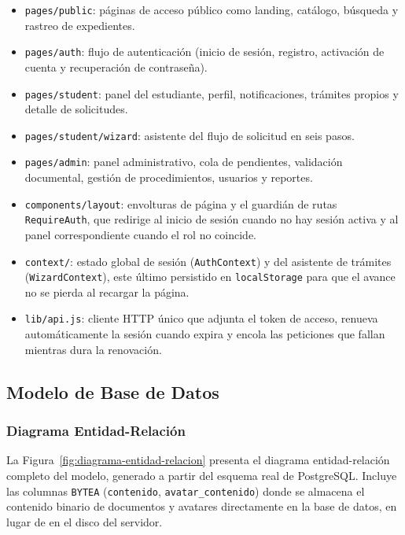 \begin{itemize}
    \item \texttt{pages/public}: páginas de acceso público como landing,
    catálogo, búsqueda y rastreo de expedientes.
    \item \texttt{pages/auth}: flujo de autenticación (inicio de sesión,
    registro, activación de cuenta y recuperación de contraseña).
    \item \texttt{pages/student}: panel del estudiante, perfil, notificaciones,
    trámites propios y detalle de solicitudes.
    \item \texttt{pages/student/wizard}: asistente del flujo de solicitud
    en seis pasos.
    \item \texttt{pages/admin}: panel administrativo, cola de pendientes,
    validación documental, gestión de procedimientos, usuarios y reportes.
    \item \texttt{components/layout}: envolturas de página y el guardián de
    rutas \texttt{RequireAuth}, que redirige al inicio de sesión cuando no
    hay sesión activa y al panel correspondiente cuando el rol no coincide.
    \item \texttt{context/}: estado global de sesión (\texttt{AuthContext}) y
    del asistente de trámites (\texttt{WizardContext}), este último
    persistido en \texttt{localStorage} para que el avance no se pierda al
    recargar la página.
    \item \texttt{lib/api.js}: cliente HTTP único que adjunta el token de
    acceso, renueva automáticamente la sesión cuando expira y encola las
    peticiones que fallan mientras dura la renovación.
\end{itemize}

\subsection{Modelo de Base de Datos}

\subsubsection{Diagrama Entidad-Relación}
La Figura~\ref{fig:diagrama-entidad-relacion} presenta el diagrama
entidad-relación completo del modelo, generado a partir del esquema real de
PostgreSQL. Incluye las columnas \texttt{BYTEA} (\texttt{contenido},
\texttt{avatar\_contenido}) donde se almacena el contenido binario de
documentos y avatares directamente en la base de datos, en lugar de en el
disco del servidor.

